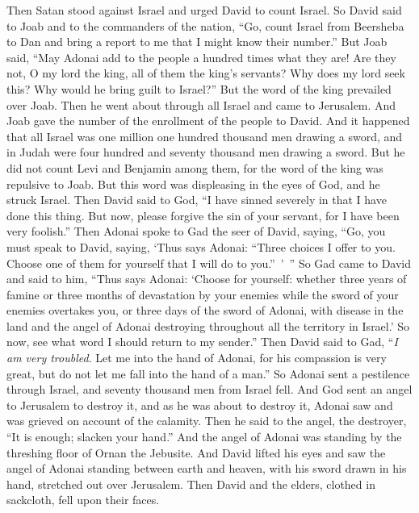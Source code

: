 \begin{biblechapter} %
 Then Satan stood against Israel and urged David to count Israel.
\verse So David said to Joab and to the commanders of the nation, “Go, count Israel from Beersheba to Dan and bring a report to me that I might know their number.”
\verse But Joab said, “May Adonai add to the people a hundred times what they are! Are they not, O my lord the king, all of them the king’s servants? Why does my lord seek this? Why would he bring guilt to Israel?”
\verse But the word of the king prevailed over Joab. Then he went about through all Israel and came to Jerusalem.
\verse And Joab gave the number of the enrollment of the people to David. And it happened that all Israel was one million one hundred thousand men drawing a sword, and in Judah were four hundred and seventy thousand men drawing a sword.
\verse But he did not count Levi and Benjamin among them, for the word of the king was repulsive to Joab.
\verse But this word was displeasing in the eyes of God, and he struck Israel.
\verse Then David said to God, “I have sinned severely in that I have done this thing. But now, please forgive the sin of your servant, for I have been very foolish.”
\verse Then Adonai spoke to Gad the seer of David, saying,
\verse “Go, you must speak to David, saying, ‘Thus says Adonai: “Three choices I offer to you. Choose one of them for yourself that I will do to you.” ’ ”
\verse So Gad came to David and said to him, “Thus says Adonai: ‘Choose for yourself:
\verse whether three years of famine or three months of devastation by your enemies while the sword of your enemies overtakes you, or three days of the sword of Adonai, with disease in the land and the angel of Adonai destroying throughout all the territory in Israel.’ So now, see what word I should return to my sender.”
\verse Then David said to Gad, “\textit{I am very troubled}. Let me into the hand of Adonai, for his compassion is very great, but do not let me fall into the hand of a man.”
\verse So Adonai sent a pestilence through Israel, and seventy thousand men from Israel fell.
\verse And God sent an angel to Jerusalem to destroy it, and as he was about to destroy it, Adonai saw and was grieved on account of the calamity. Then he said to the angel, the destroyer, “It is enough; slacken your hand.” And the angel of Adonai was standing by the threshing floor of Ornan the Jebusite.
\verse And David lifted his eyes and saw the angel of Adonai standing between earth and heaven, with his sword drawn in his hand, stretched out over Jerusalem. Then David and the elders, clothed in sackcloth, fell upon their faces.

\end{biblechapter}
